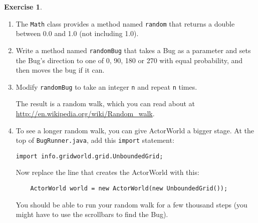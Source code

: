 \documentclass[12pt]{book}
\theoremstyle{definition}
\newtheorem{excz}{Exercise}[chapter]
\newenvironment{exercise}{\bigskip\begin{excz}\mbox{}}{\end{excz}}
\begin{document}
\begin{exercise}

\begin{enumerate}

\item The {\tt Math} class provides a method named {\tt random}
that returns a double between 0.0 and 1.0 (not including 1.0).

\item Write a method named {\tt randomBug} that takes a Bug as a
  parameter and sets the Bug's direction to one of 0, 90, 180 or 270
  with equal probability, and then moves the bug if it can.

\item Modify {\tt randomBug} to take an integer {\tt n} and repeat
{\tt n} times.

The result is a random walk, which you can read about
at \url{http://en.wikipedia.org/wiki/Random_walk}.

\item To see a longer random walk, you can give ActorWorld a bigger stage.
At the top of {\tt BugRunner.java}, add this {\tt import} statement:

\begin{lstlisting}
import info.gridworld.grid.UnboundedGrid;
\end{lstlisting}

Now replace the line that creates the ActorWorld with this:

\begin{lstlisting}
    ActorWorld world = new ActorWorld(new UnboundedGrid());
\end{lstlisting}

You should be able to run your random walk for a few thousand
steps (you might have to use the scrollbars to find the Bug).

\end{enumerate}
\end{exercise}
\end{document}
